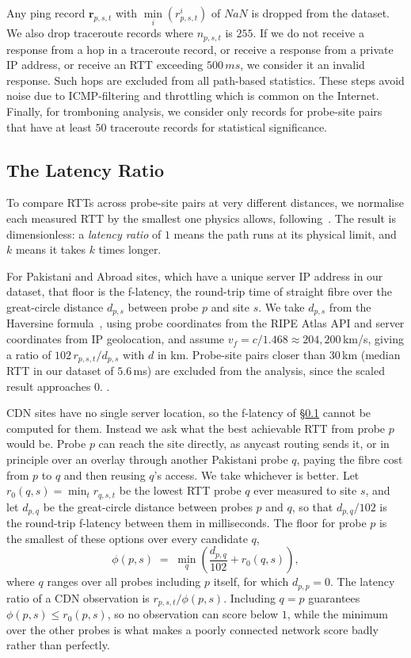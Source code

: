 \documentclass[sigconf,anonymous,10pt]{acmart}
\begin{document}
Any ping record $\mathbf{r}_{p, s, t}$ with $\min\limits_{i}(r_{p, s, t}^i)$ of $NaN$ is dropped from the dataset.
We also drop traceroute records where $n_{p, s, t}$ is $255$. If we do not receive a response from a hop in a traceroute record, or receive a response from a private IP address, or receive an RTT exceeding $500\,ms$, we consider it an invalid response. Such hops are excluded from all path-based statistics. These steps avoid noise due to ICMP-filtering and throttling which is common on the Internet. Finally, for tromboning analysis, we consider only records for probe-site pairs that have at least $50$ traceroute records for statistical significance.
\subsection{The Latency Ratio}
\label{sec:ratio}
To compare RTTs across probe-site pairs at very different distances, we normalise each measured RTT by the smallest one physics allows, following~\cite{bozkurt:dissecting:2018}. The result is dimensionless: a \emph{latency ratio} of $1$ means the path runs at its physical limit, and $k$ means it takes $k$ times longer.

For Pakistani and Abroad sites, which have a unique server IP address in our dataset, that floor is the f-latency, the round-trip time of straight fibre over the great-circle distance $d_{p,s}$ between probe $p$ and site $s$. We take $d_{p,s}$ from the Haversine formula~\cite{robusto:1957:cosine}, using probe coordinates from the RIPE Atlas API and server coordinates from IP geolocation, and assume $v_f = c/1.468 \approx 204{,}200$\,km/s, giving a ratio of $102\,r_{p,s,t}/d_{p,s}$ with $d$ in km. Probe-site pairs closer than $30$\,km (median RTT in our dataset of $5.6$\,ms) are excluded from the analysis, since the scaled result approaches $0$. .

CDN sites have no single server location, so the f-latency of \S\ref{sec:ratio} cannot be computed for them. Instead we ask what the best achievable RTT from probe $p$ would be. Probe $p$ can reach the site directly, as anycast routing sends it, or in principle over an overlay through another Pakistani probe $q$, paying the fibre cost from $p$ to $q$ and then reusing $q$'s access. We take whichever is better. Let $r_0(q,s) = \min_t r_{q,s,t}$ be the lowest RTT probe $q$ ever measured to site $s$, and let $d_{p,q}$ be the great-circle distance between probes $p$ and $q$, so that $d_{p,q}/102$ is the round-trip f-latency between them in milliseconds. The floor for probe $p$ is the smallest of these options over every candidate $q$,
\[
  \phi(p,s) \;=\; \min_{q}\left(\frac{d_{p,q}}{102} + r_0(q,s)\right),
\]
where $q$ ranges over all probes including $p$ itself, for which $d_{p,p} = 0$. The latency ratio of a CDN observation is $r_{p,s,t}/\phi(p,s)$. Including $q=p$ guarantees $\phi(p,s) \le r_0(p,s)$, so no observation can score below $1$, while the minimum over the other probes is what makes a poorly connected network score badly rather than perfectly.
\end{document}
